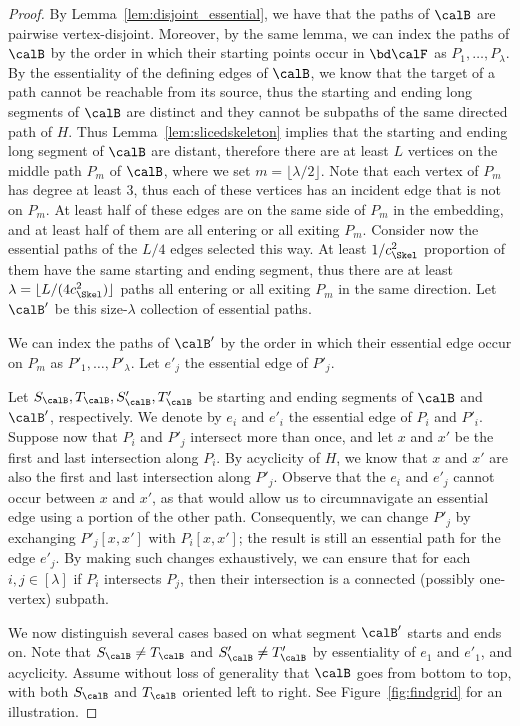 \begin{proof}
By Lemma~\ref{lem:disjoint_essential}, we have that the paths of $\calB$ are pairwise vertex-disjoint. Moreover, by the same lemma, we can index  the paths of $\calB$ by the order in which their starting points occur in $\bd \calF$ as $P_1,\dots,P_\lambda$. By the essentiality of the defining edges of $\calB$, we know that the target of a path cannot be reachable from its source, thus the starting and ending long segments of $\calB$ are distinct and they cannot be subpaths of the same directed path of $H$. Thus Lemma~\ref{lem:slicedskeleton} implies that the starting and ending long segment of $\calB$ are distant, therefore there are at least $L$ vertices on the middle path $P_m$ of $\calB$, where we set $m=\lfloor \lambda/2 \rfloor$. Note that each vertex of $P_m$ has degree at least $3$, thus each of these vertices has an incident edge that is not on $P_m$. At least half of these edges are on the same side of $P_m$ in the embedding, and at least half of them are all entering or all exiting $P_m$. Consider now the essential paths of the $L/4$ edges selected this way. At least $1/c^2_\Skel$ proportion of them have the same starting and ending segment, thus there are at least $\lambda=\lfloor L/(4c^2_\Skel)\rfloor$ paths all entering or all exiting $P_m$ in the same direction. Let $\calB'$ be this size-$\lambda$ collection of essential paths.

We can index the paths of $\calB'$ by the order in which their essential edge occur on $P_m$ as $P'_1,\dots,P'_\lambda$. Let $e'_j$ the essential edge of $P'_j$.

Let $S_\calB, T_\calB, S'_\calB, T'_\calB$ be starting and ending segments of $\calB$ and $\calB'$, respectively. We denote by $e_i$ and $e'_i$ the essential edge of $P_i$ and $P'_i$. Suppose now that $P_i$ and $P'_j$ intersect more than once, and let $x$ and $x'$ be the first and last intersection along $P_i$. By acyclicity of $H$, we know that $x$ and $x'$ are also the first and last intersection along $P'_j$. Observe that the $e_i$ and $e'_j$ cannot occur between $x$ and $x'$, as that would allow us to circumnavigate an essential edge using a portion of the other path. Consequently, we can change $P'_j$ by exchanging $P'_j[x,x']$ with $P_i[x,x']$; the result is still an essential path for the edge $e'_j$. By making such changes exhaustively, we can ensure that for each $i,j\in [\lambda]$ if $P_i$ intersects $P_j$, then their intersection is a connected (possibly one-vertex) subpath. 

We now distinguish several cases based on what segment $\calB'$ starts and ends on.  Note that $S_\calB\neq T_\calB$ and $S'_\calB\neq T'_\calB$ by essentiality of $e_1$ and $e'_1$, and acyclicity. Assume without loss of generality that $\calB$ goes from bottom to top, with both $S_\calB$ and $T_\calB$ oriented left to right. See Figure~\ref{fig:findgrid}	 for an illustration.



\end{proof}
